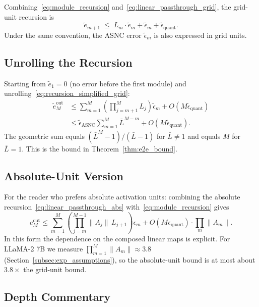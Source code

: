 \documentclass{article}
\theoremstyle{plain}
\theoremstyle{definition}
\theoremstyle{remark}
\begin{document}
Combining~\eqref{eq:module_recursion} and~\eqref{eq:linear_passthrough_grid},
the grid-unit recursion is
\begin{equation}
\label{eq:recursion_simplified_grid}
\tilde e_{m+1} \;\le\; L_m \cdot \tilde e_m + \tilde\epsilon_m + \tilde\epsilon_\mathrm{quant}.
\end{equation}
Under the same convention, the ASNC error $\tilde\epsilon_m$ is also expressed
in grid units.

\subsection{Unrolling the Recursion}
\label{app:unroll}

Starting from $\tilde e_1 = 0$ (no error before the first module) and
unrolling~\eqref{eq:recursion_simplified_grid}:
\begin{align}
\tilde e_M^\mathrm{out}
&\le \sum_{m=1}^{M} \left(\prod_{j=m+1}^{M} L_j\right) \tilde\epsilon_m
    + O(M \tilde\epsilon_\mathrm{quant}) \nonumber \\
&\le \tilde\epsilon_{\mathrm{ASNC}} \sum_{m=1}^{M} \bar{L}^{M-m}
    + O(M \tilde\epsilon_\mathrm{quant}). \label{eq:unrolled}
\end{align}
The geometric sum equals $(\bar{L}^M-1)/(\bar{L}-1)$ for $\bar{L}\ne 1$ and
equals $M$ for $\bar{L}=1$. This is the bound in Theorem~\ref{thm:e2e_bound}.

\subsection{Absolute-Unit Version}
\label{app:e2e_abs}

For the reader who prefers absolute activation units: combining the absolute
recursion~\eqref{eq:linear_passthrough_abs} with~\eqref{eq:module_recursion}
gives
\begin{equation}
e_M^\mathrm{out}
\le
\sum_{m=1}^{M} \left(\prod_{j=m}^{M-1}\|A_j\|\, L_{j+1}\right)\epsilon_m
+ O(M\epsilon_{\mathrm{quant}}) \cdot \prod_m \|A_m\|.
\end{equation}
In this form the dependence on the composed linear maps is explicit. For
LLaMA-2 7B we measure
$\prod_{m=1}^{M}\|A_m\| \approx 3.8$ (Section~\ref{subsec:exp_assumptions}),
so the absolute-unit bound is at most about $3.8\times$ the grid-unit bound.

\subsection{Depth Commentary}
\label{app:depth_commentary}
\end{document}

